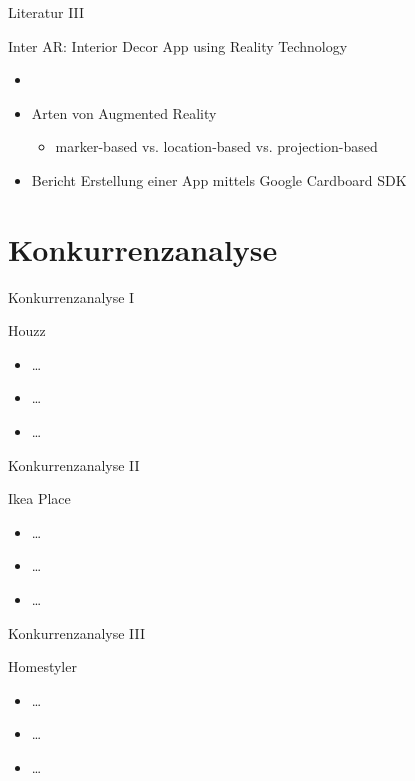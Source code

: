 \documentclass[presentation,bigger,aspectratio=169]{beamer}
\begin{document}
\begin{frame}[label={sec:org1cd6b39}]{Literatur III}
\begin{block}{Inter AR: Interior Decor App using Reality Technology}
\begin{itemize}
\item \textcite{moaresInterARInterior2020}
\item Arten von Augmented Reality
\begin{itemize}
\item marker-based vs. location-based vs. projection-based
\end{itemize}
\item Bericht Erstellung einer App mittels Google Cardboard SDK
\end{itemize}
\end{block}
\end{frame}

\section{Konkurrenzanalyse}
\label{sec:org43e65e9}
\begin{frame}[label={sec:org2367b6e}]{\vspace{2.2cm}\begin{center}\MakeUppercase{\insertsection}\end{center}}
\end{frame}

\begin{frame}[label={sec:orgc5d7442}]{Konkurrenzanalyse I}
\begin{block}{Houzz}
\begin{itemize}
\item \ldots{}
\item \ldots{}
\item \ldots{}
\end{itemize}
\end{block}
\end{frame}
\begin{frame}[label={sec:org57658bf}]{Konkurrenzanalyse II}
\begin{block}{Ikea Place}
\begin{itemize}
\item \ldots{}
\item \ldots{}
\item \ldots{}
\end{itemize}
\end{block}
\end{frame}
\begin{frame}[label={sec:org6173b80}]{Konkurrenzanalyse III}
\begin{block}{Homestyler}
\begin{itemize}
\item \ldots{}
\item \ldots{}
\item \ldots{}
\end{itemize}
\end{block}
\end{frame}
\end{document}
